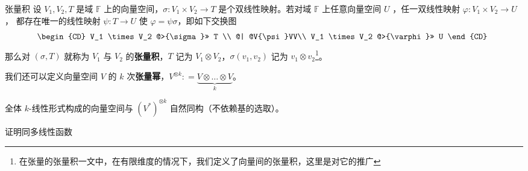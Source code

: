 
\begin{issues}
\issueDraft
\end{issues}


\begin{definition}{张量积}\label{def_vecTsr_1}
设 $V_1, V_2,T$ 是域 $\mathbb F$ 上的向量空间，$\sigma: V_1 \times V_2 \rightarrow T$ 是个双线性映射。若对域 $\mathbb F$ 上任意向量空间 $U$ ，任一双线性映射 $\varphi:V_1\times V_2\rightarrow U$， 都存在唯一的线性映射 $\psi:T\rightarrow U$ 使 $\varphi=\psi\sigma$，即如下交换图
\begin{equation}
\begin{CD}
V_1 \times V_2 @>{\sigma}>> T \\
@| @V{\psi}VV\\
V_1 \times V_2 @>{\varphi}>> U
\end{CD}~
\end{equation}
那么对 $(\sigma, T)$ 就称为 $V_1$ 与 $V_2$ 的\textbf{张量积}，$T$ 记为 $V_1 \otimes V_2$，$\sigma(v_1, v_2)$ 记为 $v_1 \otimes v_2$\footnote{在张量的张量积一文中，在有限维度的情况下，我们定义了向量间的张量积，这里是对它的推广}。

我们还可以定义向量空间 $V$ 的 $k$ 次\textbf{张量幂}，$V^{\otimes k}: = \underbrace{V \otimes \dots \otimes V}_k$。
\end{definition}


\begin{theorem}{}
全体 $k$-线性形式构成的向量空间与 $(V^*)^{\otimes k}$ 自然同构（不依赖基的选取）。
\end{theorem}
证明同多线性函数